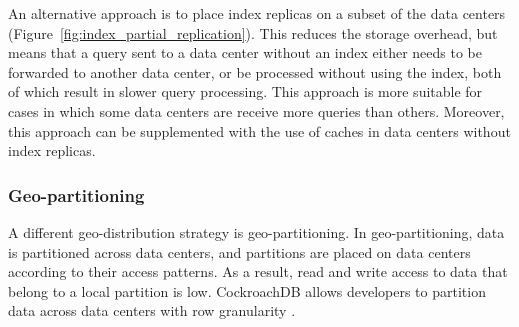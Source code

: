 An alternative approach is to place index replicas on a subset of the data centers (Figure~\ref{fig:index_partial_replication}).
This reduces the storage overhead, but means that a query sent to a data center without an index
either needs to be forwarded to another data center, or be processed without using the index,
both of which result in slower query processing.
This approach is more suitable for cases in which some data centers are receive more queries than others.
Moreover, this approach can be supplemented with the use of caches in data centers without index replicas.


\subsubsection{Geo-partitioning}
A different geo-distribution strategy is geo-partitioning.
In geo-partitioning, data is partitioned across data centers, and partitions are placed on data centers according to
their access patterns.
As a result, read and write access to data that belong to a local partition is low.
CockroachDB allows developers to partition data across data centers with row granularity
\cite{cockroachdb:geopartitioning}.

